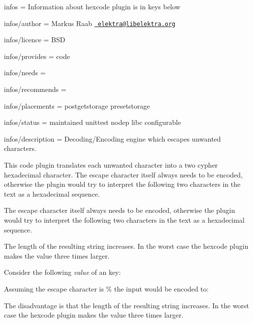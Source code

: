 
\begin{DoxyItemize}
\item infos = Information about hexcode plugin is in keys below
\item infos/author = Markus Raab \href{mailto:elektra@libelektra.org}{\texttt{ elektra@libelektra.\+org}}
\item infos/licence = B\+SD
\item infos/provides = code
\item infos/needs =
\item infos/recommends =
\item infos/placements = postgetstorage presetstorage
\item infos/status = maintained unittest nodep libc configurable
\item infos/description = Decoding/\+Encoding engine which escapes unwanted characters.
\end{DoxyItemize}

This code plugin translates each unwanted character into a two cypher hexadecimal character. The escape character itself always needs to be encoded, otherwise the plugin would try to interpret the following two characters in the text as a hexadecimal sequence.


\begin{DoxyItemize}
\item The escape character itself always needs to be encoded, otherwise the plugin would try to interpret the following two characters in the text as a hexadecimal sequence.
\item The length of the resulting string increases. In the worst case the hexcode plugin makes the value three times larger.
\end{DoxyItemize}

Consider the following {\itshape value} of an key\+:


\begin{DoxyCode}{0}
\end{DoxyCode}


Assuming the escape character is \% the input would be encoded to\+:


\begin{DoxyCode}{0}
\end{DoxyCode}


The disadvantage is that the length of the resulting string increases. In the worst case the hexcode plugin makes the value three times larger.

